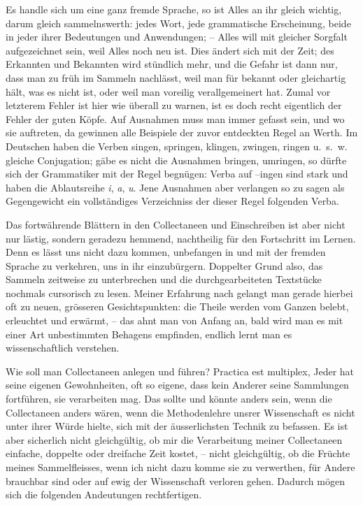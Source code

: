 Es handle sich um eine ganz fremde Sprache, so ist Alles an ihr gleich wichtig, darum gleich sammelnswerth: jedes Wort, jede grammatische Erscheinung, beide in jeder ihrer Bedeutungen und Anwendungen; – Alles will mit gleicher Sorgfalt aufgezeichnet sein, weil Alles noch neu ist. Dies ändert sich mit der Zeit; des Erkannten und Bekannten wird stündlich mehr, und die Gefahr ist dann nur, dass man zu früh im Sammeln nachlässt, weil man für bekannt oder gleichartig hält, was es nicht ist, oder weil man voreilig verallgemeinert hat. Zumal vor letzterem Fehler ist hier wie überall zu warnen, ist es doch recht eigentlich der Fehler der guten Köpfe. Auf Ausnahmen muss man immer gefasst sein, und wo sie auftreten, da gewinnen alle Beispiele der zuvor entdeckten Regel an Werth. Im Deutschen haben die Verben singen, springen, klingen, zwingen, ringen u.~s.~w. gleiche Conjugation; gäbe es nicht die Ausnahmen bringen, umringen, so dürfte sich der Grammatiker mit der Regel begnügen: Verba auf –ingen sind stark und haben die Ablautsreihe \textit{i}, \textit{a}, \textit{u}. Jene Ausnahmen aber verlangen so zu sagen als \label{fp.79} Gegengewicht ein vollständiges Verzeichniss der dieser Regel folgenden Verba.

Das fortwährende Blättern in den Collectaneen und Einschreiben ist aber nicht nur lästig, sondern geradezu hemmend, nachtheilig für den Fortschritt im \label{sp.78} Lernen. Denn es lässt uns nicht dazu kommen, unbefangen in und mit der fremden Sprache zu verkehren, uns in ihr einzubürgern. Doppelter Grund also, das Sammeln zeitweise zu unterbrechen und die durchgearbeiteten Textstücke nochmals cursorisch zu lesen. Meiner Erfahrung nach gelangt man gerade hierbei oft zu neuen, grösseren Gesichtspunkten: die Theile werden vom Ganzen belebt, erleuchtet und erwärmt, – das ahnt man von Anfang an, bald wird man es mit einer Art unbestimmten Behagens empfinden, endlich lernt man es wissenschaftlich verstehen.

\largerpage[1]Wie soll man Collectaneen anlegen und führen? Practica est multiplex, Jeder hat seine eigenen Gewohnheiten, oft so eigene, dass kein Anderer seine Sammlungen fortführen, sie verarbeiten mag. Das sollte und könnte anders sein, wenn die Collectaneen anders wären, wenn die Methodenlehre unsrer Wissenschaft es nicht unter ihrer Würde hielte, sich mit der äusserlichsten Technik zu befassen. Es ist aber sicherlich nicht gleichgültig, ob mir die Verarbeitung meiner Collectaneen einfache, doppelte oder dreifache Zeit kostet, – nicht gleichgültig, ob die Früchte meines Sammelfleisses, wenn ich nicht dazu komme sie zu verwerthen, für Andere brauchbar sind oder auf ewig der Wissenschaft verloren gehen. Dadurch mögen sich die folgenden Andeutungen rechtfertigen.

